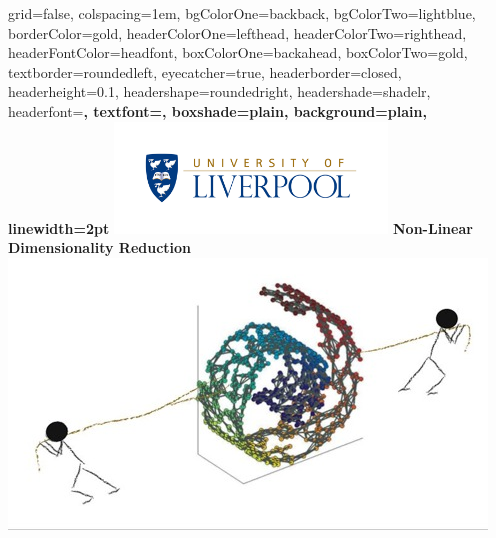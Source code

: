\documentclass[portrait,final,a0paper,fontscale=0.277]{baposter}
\begin{document}
\begin{poster}%
  {
  grid=false,
  colspacing=1em,
  bgColorOne=backback,
  bgColorTwo=lightblue,
  borderColor=gold,
  headerColorOne=lefthead,
  headerColorTwo=righthead,
  headerFontColor=headfont,
  boxColorOne=backahead,
  boxColorTwo=gold,
  textborder=roundedleft,
  eyecatcher=true,
  headerborder=closed,
  headerheight=0.1\textheight,
  headershape=roundedright,
  headershade=shadelr,
  headerfont=\Large\bf\textsc, %
  textfont={\setlength{\parindent}{1.5em}},
  boxshade=plain,
  background=plain,
  linewidth=2pt
  }
  {%
    \includegraphics[height=8.0em]{images/logo}
  }
  {\sf\bf {Non-Linear Dimensionality Reduction}\vspace{0.3 em}}
  {}
{\includegraphics[height=6 em]{images/manifold}} 
  
  

    \newcommand{\colouredcircle}{%
      \tikz{\useasboundingbox (-0.2em,-0.32em) rectangle(0.2em,0.32em); \draw[draw=black,fill=lightblue,line width=0.03em] (0,0) circle(0.18em);}}


\end{poster}
\end{document}
